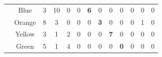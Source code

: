 \begin{table}[]
{\begin{tabular}{ccccccccccccc}
\multicolumn{1}{|l|}{}                                & \multicolumn{1}{c|}{Blue}      & \multicolumn{1}{c|}{3}                                    & \multicolumn{1}{c|}{10}                                   & \multicolumn{1}{c|}{0}                                    & \multicolumn{1}{c|}{0}                                  & \multicolumn{1}{c|}{\cellcolor[HTML]{32CB00}\textbf{6}} & \multicolumn{1}{c|}{0}                                  & \multicolumn{1}{c|}{0}                                  & \multicolumn{1}{c|}{0}                                  & \multicolumn{1}{c|}{0}                                  & \multicolumn{1}{c|}{0}                                  & \multicolumn{1}{c|}{0}                                  \\ \cline{2-13} 
\multicolumn{1}{|l|}{}                                & \multicolumn{1}{c|}{Orange}    & \multicolumn{1}{c|}{8}                                    & \multicolumn{1}{c|}{3}                                    & \multicolumn{1}{c|}{0}                                    & \multicolumn{1}{c|}{0}                                  & \multicolumn{1}{c|}{0}                                  & \multicolumn{1}{c|}{\cellcolor[HTML]{32CB00}\textbf{3}} & \multicolumn{1}{c|}{0}                                  & \multicolumn{1}{c|}{0}                                  & \multicolumn{1}{c|}{0}                                  & \multicolumn{1}{c|}{1}                                  & \multicolumn{1}{c|}{0}                                  \\ \cline{2-13} 
\multicolumn{1}{|l|}{}                                & \multicolumn{1}{c|}{Yellow}    & \multicolumn{1}{c|}{3}                                    & \multicolumn{1}{c|}{1}                                    & \multicolumn{1}{c|}{2}                                    & \multicolumn{1}{c|}{0}                                  & \multicolumn{1}{c|}{0}                                  & \multicolumn{1}{c|}{0}                                  & \multicolumn{1}{c|}{\cellcolor[HTML]{32CB00}\textbf{7}} & \multicolumn{1}{c|}{0}                                  & \multicolumn{1}{c|}{0}                                  & \multicolumn{1}{c|}{0}                                  & \multicolumn{1}{c|}{0}                                  \\ \cline{2-13} 
\multicolumn{1}{|l|}{}                                & \multicolumn{1}{c|}{Green}     & \multicolumn{1}{c|}{5}                                    & \multicolumn{1}{c|}{1}                                    & \multicolumn{1}{c|}{4}                                    & \multicolumn{1}{c|}{0}                                  & \multicolumn{1}{c|}{0}                                  & \multicolumn{1}{c|}{0}                                  & \multicolumn{1}{c|}{0}                                  & \multicolumn{1}{c|}{\cellcolor[HTML]{C0C0C0}\textbf{0}} & \multicolumn{1}{c|}{0}                                  & \multicolumn{1}{c|}{0}                                  & \multicolumn{1}{c|}{0}                                  \\ \cline{2-13} 

\end{tabular}}
\end{table}
